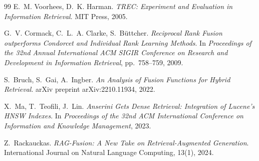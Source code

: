\documentclass[runningheads,a4paper]{llncs}
\begin{document}
\begin{thebibliography}{99}
E.~M. Voorhees, D.~K. Harman.
\newblock \textit{TREC: Experiment and Evaluation in Information Retrieval}.
\newblock MIT Press, 2005.

G.~V. Cormack, C.~L.~A. Clarke, S.~B{\"u}ttcher.
\newblock \textit{Reciprocal Rank Fusion outperforms Condorcet and Individual Rank Learning Methods}.
\newblock In \textit{Proceedings of the 32nd Annual International ACM SIGIR Conference on Research and Development in Information Retrieval}, pp.~758--759, 2009.

S.~Bruch, S.~Gai, A.~Ingber.
\newblock \textit{An Analysis of Fusion Functions for Hybrid Retrieval}.
\newblock arXiv preprint arXiv:2210.11934, 2022.

X.~Ma, T.~Teofili, J.~Lin.
\newblock \textit{Anserini Gets Dense Retrieval: Integration of Lucene's HNSW Indexes}.
\newblock In \textit{Proceedings of the 32nd ACM International Conference on Information and Knowledge Management}, 2023.

Z.~Rackauckas.
\newblock \textit{RAG-Fusion: A New Take on Retrieval-Augmented Generation}.
\newblock International Journal on Natural Language Computing, 13(1), 2024.


\end{thebibliography}

\clearpage

\end{document}
